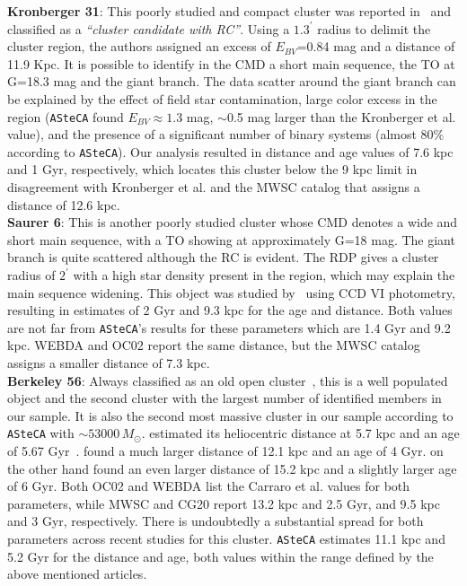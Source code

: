 \documentclass[referee]{aa}
\begin{document}
\begin{appendix}
  \noindent \textbf{Kronberger 31}: This poorly studied and compact cluster was reported
  in~\cite{Kronberger_2006} and classified as a \emph{``cluster candidate with
  RC''}. Using a $1.3^{\prime}$ radius to delimit the cluster region, the authors
  assigned an excess of $E_{BV}$=0.84 mag and a distance of 11.9 Kpc.
  It is possible to identify in the CMD a short main sequence, the TO at G=18.3
  mag and the giant branch. The data scatter around the giant branch can be
  explained by the effect of field star contamination, large color excess in the
  region (\texttt{ASteCA} found $E_{BV}\approx1.3$ mag, $\sim$0.5 mag larger
  than the Kronberger et al. value), and the presence of a significant number of binary
  systems (almost 80\% according to \texttt{ASteCA}). Our analysis resulted in
  distance and age values of 7.6 kpc and 1 Gyr, respectively, which
  locates this cluster below the 9 kpc limit in disagreement with Kronberger et
  al. and the MWSC catalog that assigns a distance of 12.6 kpc.\\

  \noindent \textbf{Saurer 6}: This is another poorly studied cluster whose CMD denotes a
  wide and short main sequence, with a TO showing at approximately G=18 mag. The
  giant branch is quite scattered although the RC is evident.
  The RDP gives a cluster radius of $2^{\prime}$ with a high star density
  present in the region, which may explain the main sequence widening.
  This object was studied by~\cite{Frinchaboy_2002} using CCD VI photometry,
  resulting in estimates of 2 Gyr and 9.3 kpc for the age and distance.
  Both values are not far from \texttt{ASteCA}'s results for these parameters
  which are 1.4 Gyr and 9.2 kpc. WEBDA and OC02 report the same distance, but
  the MWSC catalog assigns a smaller distance of 7.3 kpc.\\

  \noindent \textbf{Berkeley 56}: Always classified as an old open
  cluster~\citep[see for example][]{King_1964}, this is a well populated object
  and the second cluster with the largest number of identified members in our
  sample. It is also the second most massive cluster in our sample according
  to \texttt{ASteCA} with $\sim53000\,M_{\odot}$.
  \cite{Janes_1994} estimated its heliocentric distance at 5.7 kpc and an age of
  5.67 Gyr~\citep[according to][]{Salaris_2004}. \cite{Carraro_2006} found a
  much larger distance of 12.1 kpc and an age of 4 Gyr. \cite{Janes_2011} on the
  other hand found an even larger distance of 15.2 kpc and a slightly larger age
  of 6 Gyr.
  Both OC02 and WEBDA list the Carraro et al. values for both parameters, while
  MWSC and CG20 report 13.2 kpc and 2.5 Gyr, and 9.5 kpc and 3
  Gyr, respectively. There is undoubtedly a substantial spread for both
  parameters across recent studies for this cluster.
  \texttt{ASteCA} estimates 11.1 kpc and 5.2 Gyr for the distance and age,
  both values within the range defined by the above mentioned articles.\\


\end{appendix}
\end{document}
